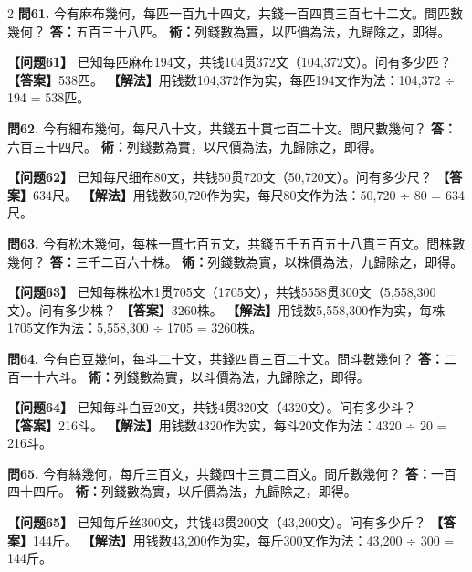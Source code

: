 \documentclass[11pt,a4paper]{article}
\begin{document}
\begin{paracol}{2}
\textbf{問61.} 今有麻布幾何，每匹一百九十四文，共錢一百四貫三百七十二文。問匹數幾何？\break
\textbf{答：}五百三十八匹。\break
\textbf{術：}列錢數為實，以匹價為法，九歸除之，即得。

\switchcolumn

\textbf{【问题61】} 已知每匹麻布194文，共钱104贯372文（104,372文）。问有多少匹？\break
\textbf{【答案】}538匹。\break
\textbf{【解法】}用钱数104,372作为实，每匹194文作为法：104,372 ÷ 194 = 538匹。

\switchcolumn*

\textbf{問62.} 今有細布幾何，每尺八十文，共錢五十貫七百二十文。問尺數幾何？\break
\textbf{答：}六百三十四尺。\break
\textbf{術：}列錢數為實，以尺價為法，九歸除之，即得。

\switchcolumn

\textbf{【问题62】} 已知每尺细布80文，共钱50贯720文（50,720文）。问有多少尺？\break
\textbf{【答案】}634尺。\break
\textbf{【解法】}用钱数50,720作为实，每尺80文作为法：50,720 ÷ 80 = 634尺。

\switchcolumn*

\textbf{問63.} 今有松木幾何，每株一貫七百五文，共錢五千五百五十八貫三百文。問株數幾何？\break
\textbf{答：}三千二百六十株。\break
\textbf{術：}列錢數為實，以株價為法，九歸除之，即得。

\switchcolumn

\textbf{【问题63】} 已知每株松木1贯705文（1705文），共钱5558贯300文（5,558,300文）。问有多少株？\break
\textbf{【答案】}3260株。\break
\textbf{【解法】}用钱数5,558,300作为实，每株1705文作为法：5,558,300 ÷ 1705 = 3260株。

\switchcolumn*

\textbf{問64.} 今有白豆幾何，每斗二十文，共錢四貫三百二十文。問斗數幾何？\break
\textbf{答：}二百一十六斗。\break
\textbf{術：}列錢數為實，以斗價為法，九歸除之，即得。

\switchcolumn

\textbf{【问题64】} 已知每斗白豆20文，共钱4贯320文（4320文）。问有多少斗？\break
\textbf{【答案】}216斗。\break
\textbf{【解法】}用钱数4320作为实，每斗20文作为法：4320 ÷ 20 = 216斗。

\switchcolumn*

\textbf{問65.} 今有絲幾何，每斤三百文，共錢四十三貫二百文。問斤數幾何？\break
\textbf{答：}一百四十四斤。\break
\textbf{術：}列錢數為實，以斤價為法，九歸除之，即得。

\switchcolumn

\textbf{【问题65】} 已知每斤丝300文，共钱43贯200文（43,200文）。问有多少斤？\break
\textbf{【答案】}144斤。\break
\textbf{【解法】}用钱数43,200作为实，每斤300文作为法：43,200 ÷ 300 = 144斤。


\end{paracol}
\end{document}
